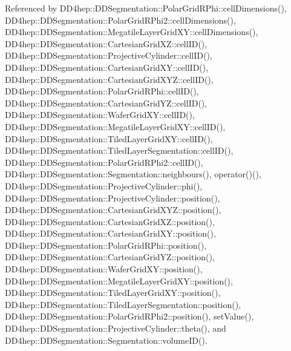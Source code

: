 Referenced by D\+D4hep\+::\+D\+D\+Segmentation\+::\+Polar\+Grid\+R\+Phi\+::cell\+Dimensions(), D\+D4hep\+::\+D\+D\+Segmentation\+::\+Polar\+Grid\+R\+Phi2\+::cell\+Dimensions(), D\+D4hep\+::\+D\+D\+Segmentation\+::\+Megatile\+Layer\+Grid\+X\+Y\+::cell\+Dimensions(), D\+D4hep\+::\+D\+D\+Segmentation\+::\+Cartesian\+Grid\+X\+Z\+::cell\+I\+D(), D\+D4hep\+::\+D\+D\+Segmentation\+::\+Projective\+Cylinder\+::cell\+I\+D(), D\+D4hep\+::\+D\+D\+Segmentation\+::\+Cartesian\+Grid\+X\+Y\+::cell\+I\+D(), D\+D4hep\+::\+D\+D\+Segmentation\+::\+Cartesian\+Grid\+X\+Y\+Z\+::cell\+I\+D(), D\+D4hep\+::\+D\+D\+Segmentation\+::\+Polar\+Grid\+R\+Phi\+::cell\+I\+D(), D\+D4hep\+::\+D\+D\+Segmentation\+::\+Cartesian\+Grid\+Y\+Z\+::cell\+I\+D(), D\+D4hep\+::\+D\+D\+Segmentation\+::\+Wafer\+Grid\+X\+Y\+::cell\+I\+D(), D\+D4hep\+::\+D\+D\+Segmentation\+::\+Megatile\+Layer\+Grid\+X\+Y\+::cell\+I\+D(), D\+D4hep\+::\+D\+D\+Segmentation\+::\+Tiled\+Layer\+Grid\+X\+Y\+::cell\+I\+D(), D\+D4hep\+::\+D\+D\+Segmentation\+::\+Tiled\+Layer\+Segmentation\+::cell\+I\+D(), D\+D4hep\+::\+D\+D\+Segmentation\+::\+Polar\+Grid\+R\+Phi2\+::cell\+I\+D(), D\+D4hep\+::\+D\+D\+Segmentation\+::\+Segmentation\+::neighbours(), operator()(), D\+D4hep\+::\+D\+D\+Segmentation\+::\+Projective\+Cylinder\+::phi(), D\+D4hep\+::\+D\+D\+Segmentation\+::\+Projective\+Cylinder\+::position(), D\+D4hep\+::\+D\+D\+Segmentation\+::\+Cartesian\+Grid\+X\+Y\+Z\+::position(), D\+D4hep\+::\+D\+D\+Segmentation\+::\+Cartesian\+Grid\+X\+Z\+::position(), D\+D4hep\+::\+D\+D\+Segmentation\+::\+Cartesian\+Grid\+X\+Y\+::position(), D\+D4hep\+::\+D\+D\+Segmentation\+::\+Polar\+Grid\+R\+Phi\+::position(), D\+D4hep\+::\+D\+D\+Segmentation\+::\+Cartesian\+Grid\+Y\+Z\+::position(), D\+D4hep\+::\+D\+D\+Segmentation\+::\+Wafer\+Grid\+X\+Y\+::position(), D\+D4hep\+::\+D\+D\+Segmentation\+::\+Megatile\+Layer\+Grid\+X\+Y\+::position(), D\+D4hep\+::\+D\+D\+Segmentation\+::\+Tiled\+Layer\+Grid\+X\+Y\+::position(), D\+D4hep\+::\+D\+D\+Segmentation\+::\+Tiled\+Layer\+Segmentation\+::position(), D\+D4hep\+::\+D\+D\+Segmentation\+::\+Polar\+Grid\+R\+Phi2\+::position(), set\+Value(), D\+D4hep\+::\+D\+D\+Segmentation\+::\+Projective\+Cylinder\+::theta(), and D\+D4hep\+::\+D\+D\+Segmentation\+::\+Segmentation\+::volume\+I\+D().

\hypertarget{class_d_d4hep_1_1_d_d_segmentation_1_1_bit_field64_a0419ced4361da328259e8c71bdd28671}{}\label{class_d_d4hep_1_1_d_d_segmentation_1_1_bit_field64_a0419ced4361da328259e8c71bdd28671} 
